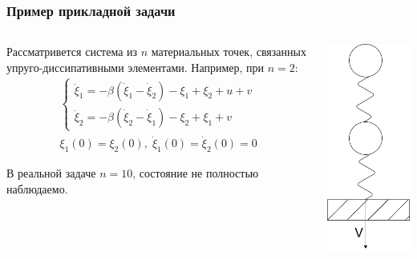 \documentclass[aspectratio=169]{beamer}
\begin{document}
\begin{frame}
  \frametitle{Пример прикладной задачи}
  \begin{columns}
    \begin{column}{0.7\textwidth}

      Рассматривется система из \(n\) материальных точек, связанных упруго-диссипативными элементами.
      Например, при \(n=2\):
      \begin{displaymath}
        \begin{array}{cr}
          \begin{cases}
            \ddot \xi_1 = -\beta(\dot\xi_1 - \dot\xi_2) - \xi_1 + \xi_2 + u + v \\
            \ddot \xi_2 = -\beta(\dot\xi_2 - \dot\xi_1) - \xi_2 + \xi_1 + v
          \end{cases} \\
          \xi_1(0)=\xi_2(0),\;\dot\xi_1(0)=\dot\xi_2(0)=0
      \end{array}
      \end{displaymath}

      В реальной задаче \(n=10\), состояние не полностью наблюдаемо.

    \end{column}
    \begin{column}{0.3\textwidth}
      \centerline{\includegraphics[width=.5\textwidth]{spring.png}}
    \end{column}
  \end{columns}

\end{frame}
\end{document}
